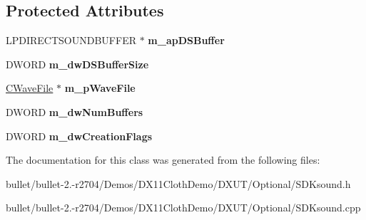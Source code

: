 \subsection*{Protected Attributes}
\begin{DoxyCompactItemize}
\item 
\hypertarget{class_c_sound_aad77495aa3800132a4f2fde0a9467b1f}{L\+P\+D\+I\+R\+E\+C\+T\+S\+O\+U\+N\+D\+B\+U\+F\+F\+E\+R $\ast$ {\bfseries m\+\_\+ap\+D\+S\+Buffer}}\label{class_c_sound_aad77495aa3800132a4f2fde0a9467b1f}

\item 
\hypertarget{class_c_sound_a69bdf453a29ab40f8b7fb2eecc026820}{D\+W\+O\+R\+D {\bfseries m\+\_\+dw\+D\+S\+Buffer\+Size}}\label{class_c_sound_a69bdf453a29ab40f8b7fb2eecc026820}

\item 
\hypertarget{class_c_sound_aa8a1f977f2acf3049096d3b74f75e500}{\hyperlink{class_c_wave_file}{C\+Wave\+File} $\ast$ {\bfseries m\+\_\+p\+Wave\+File}}\label{class_c_sound_aa8a1f977f2acf3049096d3b74f75e500}

\item 
\hypertarget{class_c_sound_ac224963b022a2ee97ca30d872f9a1927}{D\+W\+O\+R\+D {\bfseries m\+\_\+dw\+Num\+Buffers}}\label{class_c_sound_ac224963b022a2ee97ca30d872f9a1927}

\item 
\hypertarget{class_c_sound_a0787066767c1f65d7b9cd2179513d7d8}{D\+W\+O\+R\+D {\bfseries m\+\_\+dw\+Creation\+Flags}}\label{class_c_sound_a0787066767c1f65d7b9cd2179513d7d8}

\end{DoxyCompactItemize}


The documentation for this class was generated from the following files\+:\begin{DoxyCompactItemize}
\item 
bullet/bullet-\/2.-\/r2704/\+Demos/\+D\+X11\+Cloth\+Demo/\+D\+X\+U\+T/\+Optional/S\+D\+Ksound.\+h\item 
bullet/bullet-\/2.-\/r2704/\+Demos/\+D\+X11\+Cloth\+Demo/\+D\+X\+U\+T/\+Optional/S\+D\+Ksound.\+cpp\end{DoxyCompactItemize}
